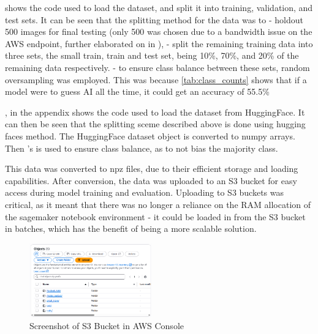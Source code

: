  shows the code used to load the dataset, and split it into training, validation, and test sets. It can be seen that the splitting method for the data was to 
- holdout 500 images for final testing (only 500 was chosen due to a bandwidth issue on the AWS endpoint, further elaborated on in ),
- split the remaining training data into three sets, the small train, train and test set, being 10\%, 70\%, and 20\% of the remaining data respectively.
- to ensure class balance between these sets, random oversampling was employed. This was because \cref{tab:class_counts} shows that if a model were to guess AI all the time, it could get an accuracy of 55.5\%

, in the appendix shows the code used to load the dataset from HuggingFace. It can then be seen that the splitting sceme described above is done using hugging faces  method. The HuggingFace dataset object is converted to numpy arrays. Then 's  is used to ensure class balance, as to not bias the majority class.



This data was converted to npz files, due to their efficient storage and loading capabilities. After conversion, the data was uploaded to an S3 bucket for easy access during model training and evaluation. Uploading to S3 buckets was critical, as it meant that there was no longer a reliance on the RAM allocation of the sagemaker notebook environment - it could be loaded in from the S3 bucket in batches, which has the benefit of being a more scalable solution.

\begin{figure}[h]
    \centering
    \includegraphics[width=200px]{figures/s3_bucket_screenshot.png} %
    \centering
    \caption{Screenshot of S3 Bucket in AWS Console} %
    \label{fig:s3_bucket} %
\end{figure}


